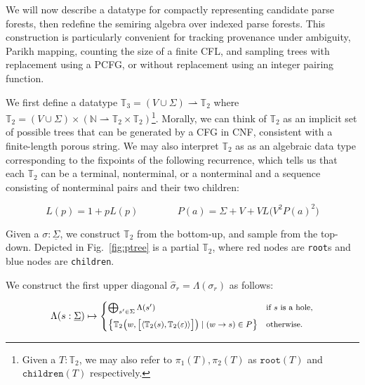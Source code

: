 \documentclass[sigplan,review,anonymous,acmsmall]{acmart}\settopmatter{printfolios=false,printccs=false,printacmref=false}
\begin{document}
  We will now describe a datatype for compactly representing candidate parse forests, then redefine the semiring algebra over indexed parse forests. This construction is particularly convenient for tracking provenance under ambiguity, Parikh mapping, counting the size of a finite CFL, and sampling trees with replacement using a PCFG, or without replacement using an integer pairing function.

  We first define a datatype $\mathbb{T}_3 = (V \cup \Sigma) \rightharpoonup \mathbb{T}_2$ where $\mathbb{T}_2 = (V \cup \Sigma) \times (\mathbb{N} \rightharpoonup \mathbb{T}_2\times\mathbb{T}_2)$\footnote{Given a $T:\mathbb{T}_2$, we may also refer to $\pi_1(T), \pi_2(T)$ as $\texttt{root}(T)$ and $\texttt{children}(T)$ respectively.}. Morally, we can think of $\mathbb{T}_2$ as an implicit set of possible trees that can be generated by a CFG in CNF, consistent with a finite-length porous string. We may also interpret $\mathbb{T}_2$ as as an algebraic data type corresponding to the fixpoints of the following recurrence, which tells us that each $\mathbb{T}_2$ can be a terminal, nonterminal, or a nonterminal and a sequence consisting of nonterminal pairs and their two children:\vspace{-10pt}

  \begin{equation}
    L(p) = 1 + p L(p) \phantom{addspace} P(a) = \Sigma + V + V L\big(V^2P(a)^2\big)
  \end{equation}

  Given a $\sigma: \underline\Sigma$, we construct $\mathbb{T}_2$ from the bottom-up, and sample from the top-down. Depicted in Fig.~\ref{fig:ptree} is a partial $\mathbb{T}_2$, where red nodes are \texttt{root}s and blue nodes are \texttt{children}.

  We construct the first upper diagonal $\hat\sigma_r = \Lambda(\sigma_r)$ as follows:

\vspace{-10pt}\begin{equation}
  \begin{footnotesize}
\Lambda(s: \underline\Sigma) \mapsto \begin{cases}
\bigoplus_{s'\in \Sigma} \Lambda(s') & \text{if $s$ is a hole,} \vspace{5pt}\\
\big\{\mathbb{T}_2\big(w, \big[\langle\mathbb{T}_2(s), \mathbb{T}_2(\varepsilon)\rangle\big]\big) \mid (w \rightarrow s)\in P\big\} & \text{otherwise.}
\end{cases}
  \end{footnotesize}
\end{equation}
\end{document}
